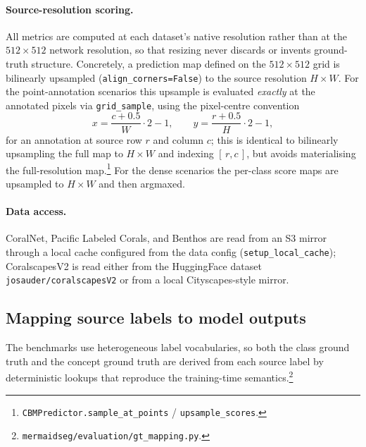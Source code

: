 \paragraph{Source-resolution scoring.}
All metrics are computed at each dataset's native resolution rather than at the
$512\times512$ network resolution, so that resizing never discards or invents
ground-truth structure. Concretely, a prediction map defined on the
$512\times512$ grid is bilinearly upsampled (\texttt{align\_corners=False}) to the
source resolution $H\times W$. For the point-annotation scenarios this upsample
is evaluated \emph{exactly} at the annotated pixels via \texttt{grid\_sample},
using the pixel-centre convention
\begin{equation}
x = \frac{c+0.5}{W}\cdot 2 - 1,
\qquad
y = \frac{r+0.5}{H}\cdot 2 - 1,
\label{eq:gridsample}
\end{equation}
for an annotation at source row $r$ and column $c$; this is identical to
bilinearly upsampling the full map to $H\times W$ and indexing $[\,r,c\,]$, but
avoids materialising the full-resolution map.\footnote{%
\texttt{CBMPredictor.sample\_at\_points} / \texttt{upsample\_scores}.} For the
dense scenarios the per-class score maps are upsampled to $H\times W$ and then
argmaxed.

\paragraph{Data access.}
CoralNet, Pacific Labeled Corals, and Benthos are read from an S3 mirror through
a local cache configured from the data config
(\texttt{setup\_local\_cache}); CoralscapesV2 is read either from the
HuggingFace dataset \texttt{josauder/coralscapesV2} or from a local
Cityscapes-style mirror.

\subsection{Mapping source labels to model outputs}
\label{sec:eval-mapping}

The benchmarks use heterogeneous label vocabularies, so both the class ground
truth and the concept ground truth are derived from each source label by
deterministic lookups that reproduce the training-time semantics.\footnote{%
\texttt{mermaidseg/evaluation/gt\_mapping.py}.}

